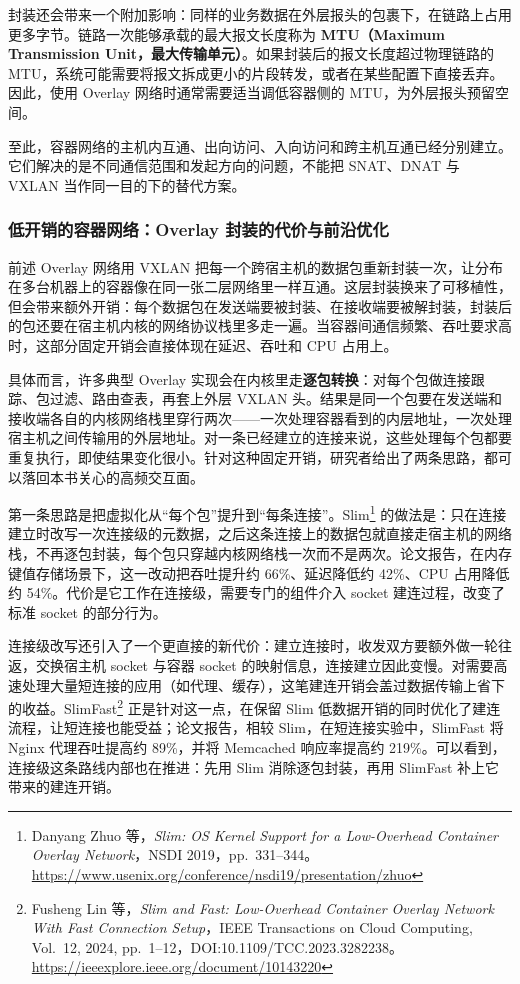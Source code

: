 封装还会带来一个附加影响：同样的业务数据在外层报头的包裹下，在链路上占用更多字节。链路一次能够承载的最大报文长度称为 \textbf{MTU（Maximum Transmission Unit，最大传输单元）}。如果封装后的报文长度超过物理链路的 MTU，系统可能需要将报文拆成更小的片段转发，或者在某些配置下直接丢弃。因此，使用 Overlay 网络时通常需要适当调低容器侧的 MTU，为外层报头预留空间。

至此，容器网络的主机内互通、出向访问、入向访问和跨主机互通已经分别建立。它们解决的是不同通信范围和发起方向的问题，不能把 SNAT、DNAT 与 VXLAN 当作同一目的下的替代方案。


\subsubsection{低开销的容器网络：Overlay 封装的代价与前沿优化}
\label{sec6:low-overhead-overlay}

前述 Overlay 网络用 VXLAN 把每一个跨宿主机的数据包重新封装一次，让分布在多台机器上的容器像在同一张二层网络里一样互通。这层封装换来了可移植性，但会带来额外开销：每个数据包在发送端要被封装、在接收端要被解封装，封装后的包还要在宿主机内核的网络协议栈里多走一遍。当容器间通信频繁、吞吐要求高时，这部分固定开销会直接体现在延迟、吞吐和 CPU 占用上。

具体而言，许多典型 Overlay 实现会在内核里走\textbf{逐包转换}：对每个包做连接跟踪、包过滤、路由查表，再套上外层 VXLAN 头。结果是同一个包要在发送端和接收端各自的内核网络栈里穿行两次——一次处理容器看到的内层地址，一次处理宿主机之间传输用的外层地址。对一条已经建立的连接来说，这些处理每个包都要重复执行，即使结果变化很小。针对这种固定开销，研究者给出了两条思路，都可以落回本书关心的高频交互面。

第一条思路是把虚拟化从“每个包”提升到“每条连接”。Slim\footnote{Danyang Zhuo 等，\emph{Slim: OS Kernel Support for a Low-Overhead Container Overlay Network}，NSDI 2019，pp.~331--344。\url{https://www.usenix.org/conference/nsdi19/presentation/zhuo}} 的做法是：只在连接建立时改写一次连接级的元数据，之后这条连接上的数据包就直接走宿主机的网络栈，不再逐包封装，每个包只穿越内核网络栈一次而不是两次。论文报告，在内存键值存储场景下，这一改动把吞吐提升约 66\%、延迟降低约 42\%、CPU 占用降低约 54\%。代价是它工作在连接级，需要专门的组件介入 socket 建连过程，改变了标准 socket 的部分行为。

连接级改写还引入了一个更直接的新代价：建立连接时，收发双方要额外做一轮往返，交换宿主机 socket 与容器 socket 的映射信息，连接建立因此变慢。对需要高速处理大量短连接的应用（如代理、缓存），这笔建连开销会盖过数据传输上省下的收益。SlimFast\footnote{Fusheng Lin 等，\emph{Slim and Fast: Low-Overhead Container Overlay Network With Fast Connection Setup}，IEEE Transactions on Cloud Computing, Vol.~12, 2024, pp.~1--12，DOI:10.1109/TCC.2023.3282238。\url{https://ieeexplore.ieee.org/document/10143220}} 正是针对这一点，在保留 Slim 低数据开销的同时优化了建连流程，让短连接也能受益；论文报告，相较 Slim，在短连接实验中，SlimFast 将 Nginx 代理吞吐提高约 89\%，并将 Memcached 响应率提高约 219\%。可以看到，连接级这条路线内部也在推进：先用 Slim 消除逐包封装，再用 SlimFast 补上它带来的建连开销。


